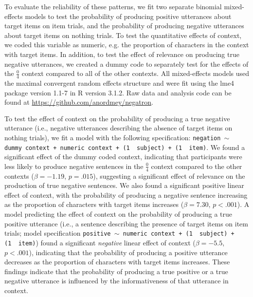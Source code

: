 \documentclass[man, noapacite]{apa2}
\begin{document}
To evaluate the reliability of these patterns, we fit two separate binomial mixed-effects models to test the probability of producing positive utterances about target items on item trials, and the probability of producing negative utterances about target items on nothing trials. To test the quantitative effects of context, we coded this variable as numeric, e.g. the proportion of characters in the context with target items. In addition, to test the effect of relevance on producing true negative utterances, we created a dummy code to separately test for the effects of the  $\frac{0}{4}$ context compared to all of the other contexts.  All mixed-effects models used the maximal convergent random effects structure and were fit using the lme4 package version 1.1-7 in R version 3.1.2. Raw data and analysis code can be found at \url{https://github.com/anordmey/negatron}.

To test the effect of context on the probability of producing a true negative utterance (i.e., negative utterances describing the absence of target items on nothing trials), we fit a model with the following specification: \texttt{negation $\sim$  dummy context + numeric context + (1~\textbar~subject) +  (1~\textbar~item)}. We  found a significant effect of the dummy coded context, indicating that participants were less likely to produce negative sentences in the $\frac{0}{4}$ context compared to the other contexts ($\beta= -1.19$, $p = .015$), suggesting a significant effect of relevance on the production of true negative sentences. We also found a significant positive linear effect of context, with the probability of producing a negative sentence increasing as the proportion of characters with target items increases ($\beta= 7.30$, $p< .001$). A model predicting the effect of context on the probability of producing a true positive utterance (i.e., a sentence describing the presence of target items on item trials; model specification \texttt{positive $\sim$  numeric context + (1~\textbar~subject) +  (1~\textbar~item)}) found a significant \emph{negative} linear effect of context ($\beta= -5.5$, $p< .001$), indicating that the probability of producing a positive utterance decreases as the proportion of characters with target items increases. These findings indicate that the probability of producing a true positive or a true negative utterance is influenced by the informativeness of that utterance in context.
\end{document}
